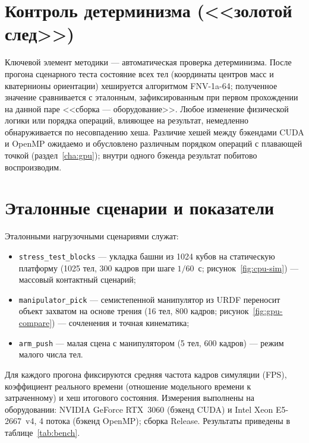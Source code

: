 \section{Контроль детерминизма (<<золотой след>>)}

Ключевой элемент методики --- автоматическая проверка детерминизма. После
прогона сценарного теста состояние всех тел (координаты центров масс и
кватернионы ориентации) хешируется алгоритмом FNV-1a-64; полученное значение
сравнивается с эталонным, зафиксированным при первом прохождении на данной
паре <<сборка --- оборудование>>. Любое изменение физической логики или
порядка операций, влияющее на результат, немедленно обнаруживается по
несовпадению хеша. Различие хешей между бэкендами CUDA и OpenMP ожидаемо и
обусловлено различным порядком операций с плавающей точкой
(раздел~\ref{cha:gpu}); внутри одного бэкенда результат побитово
воспроизводим.

\section{Эталонные сценарии и показатели}

Эталонными нагрузочными сценариями служат:
\begin{itemize}
  \item \texttt{stress\_test\_blocks} --- укладка башни из 1024 кубов на
        статическую платформу (1025 тел, 300 кадров при шаге $1/60$~с;
        рисунок~\ref{fig:cpu-sim}) --- массовый контактный сценарий;
  \item \texttt{manipulator\_pick} --- семистепенной манипулятор из URDF
        переносит объект захватом на основе трения (16 тел, 800 кадров;
        рисунок~\ref{fig:gpu-compare}) --- сочленения и точная кинематика;
  \item \texttt{arm\_push} --- малая сцена с манипулятором (5 тел,
        600 кадров) --- режим малого числа тел.
\end{itemize}
Для каждого прогона фиксируются средняя частота кадров симуляции (FPS),
коэффициент реального времени (отношение модельного времени к затраченному) и
хеш итогового состояния. Измерения выполнены на оборудовании: NVIDIA GeForce
RTX~3060 (бэкенд CUDA) и Intel Xeon E5-2667~v4, 4 потока (бэкенд OpenMP);
сборка Release. Результаты приведены в таблице~\ref{tab:bench}.

